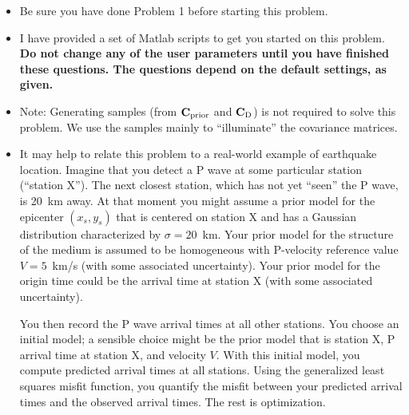 \documentclass[11pt,titlepage,fleqn]{article}
\begin{document}
\begin{itemize}
\item Be sure you have done Problem 1 before starting this problem.

\item I have provided a set of Matlab scripts to get you started on this problem. {\bf Do not change any of the user parameters until you have finished these questions. The questions depend on the default settings, as given.}

\item Note: Generating samples (from $\mbox{${\bf C}$}_{\rm prior}$ and $\mbox{${\bf C}$}_{\rm D}$) is not required to solve this problem. We use the samples mainly to ``illuminate'' the covariance matrices.

\item It may help to relate this problem to a real-world example of earthquake location. Imagine that you detect a P wave at some particular station (``station X''). The next closest station, which has not yet ``seen'' the P wave, is 20~km away. At that moment you might assume a prior model for the epicenter $(x_s, y_s)$ that is centered on station X and has a Gaussian distribution characterized by $\sigma = 20$~km. 
Your prior model for the structure of the medium is assumed to be homogeneous with P-velocity reference value $V = 5$~km/s (with some associated uncertainty). Your prior model for the origin time could be the arrival time at station X (with some associated uncertainty).

You then record the P wave arrival times at all other stations. You choose an initial model; a sensible choice might be the prior model that is station X, P arrival time at station X, and velocity $V$. With this initial model, you compute predicted arrival times at all stations. Using the generalized least squares misfit function, you quantify the misfit between your predicted arrival times and the observed arrival times. The rest is optimization.

\end{itemize}

\end{document}
